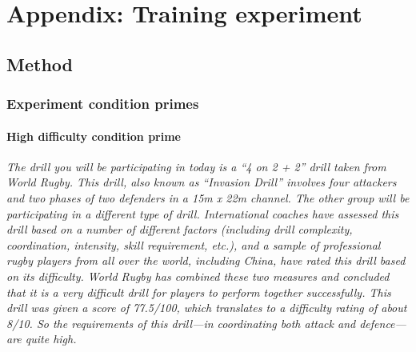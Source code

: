 \chapter{Appendix: Training experiment\label{app9:trainingExperiment}}




  \begin{CJK}{UTF8}{gbsn}







\section{Method\label{app9:method}}

\subsection{Experiment condition primes\label{app9:conditionPrime}}

\subsubsection{High difficulty condition prime\label{app9:conditionPrimeHigh}}
\textit{The drill you will be participating in today is a ``4 on 2 + 2'' drill taken from World Rugby.  This drill, also known as ``Invasion Drill'' involves four attackers and two phases of two defenders in a 15m x 22m channel.  The other group will be participating in a different type of drill.  International coaches have assessed this drill based on a number of different factors (including drill complexity, coordination, intensity, skill requirement, etc.), and a sample of professional rugby players from all over the world, including China, have rated this drill based on its difficulty.  World Rugby has combined these two measures and concluded that it is a very difficult drill for players to perform together successfully.  This drill was given a score of 77.5/100, which translates to a difficulty rating of about 8/10.  So the requirements of this drill—in coordinating both attack and defence—are quite high.}


\end{CJK}
